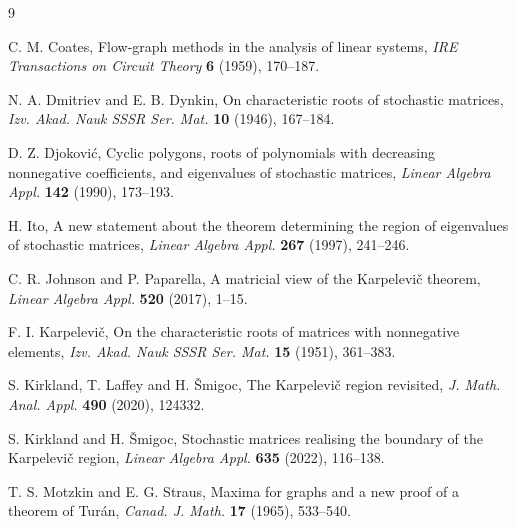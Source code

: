 \documentclass[11pt]{article}
\numberwithin{equation}{section}
\begin{document}
\begin{thebibliography}{9}

C. M. Coates,
Flow-graph methods in the analysis of linear systems,
\emph{IRE Transactions on Circuit Theory} \textbf{6} (1959), 170--187.

N. A. Dmitriev and E. B. Dynkin,
On characteristic roots of stochastic matrices,
\emph{Izv. Akad. Nauk SSSR Ser. Mat.} \textbf{10} (1946), 167--184.

D. Z. Djokovi\'c,
Cyclic polygons, roots of polynomials with decreasing nonnegative coefficients,
and eigenvalues of stochastic matrices,
\emph{Linear Algebra Appl.} \textbf{142} (1990), 173--193.

H. Ito,
A new statement about the theorem determining the region of eigenvalues of
stochastic matrices,
\emph{Linear Algebra Appl.} \textbf{267} (1997), 241--246.

C. R. Johnson and P. Paparella,
A matricial view of the Karpelevi\v{c} theorem,
\emph{Linear Algebra Appl.} \textbf{520} (2017), 1--15.

F. I. Karpelevi\v{c},
On the characteristic roots of matrices with nonnegative elements,
\emph{Izv. Akad. Nauk SSSR Ser. Mat.} \textbf{15} (1951), 361--383.

S. Kirkland, T. Laffey and H. \v{S}migoc,
The Karpelevi\v{c} region revisited,
\emph{J. Math. Anal. Appl.} \textbf{490} (2020), 124332.

S. Kirkland and H. \v{S}migoc,
Stochastic matrices realising the boundary of the Karpelevi\v{c} region,
\emph{Linear Algebra Appl.} \textbf{635} (2022), 116--138.

T. S. Motzkin and E. G. Straus,
Maxima for graphs and a new proof of a theorem of Tur\'an,
\emph{Canad. J. Math.} \textbf{17} (1965), 533--540.

\end{thebibliography}
\end{document}

